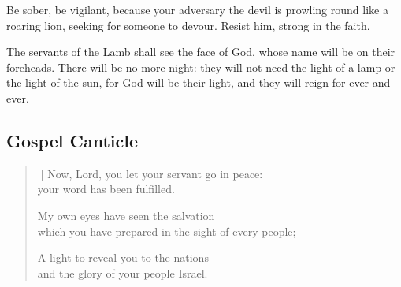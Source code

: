 \documentclass[12pt]{report}
\begin{document}
	\alternative

	\begin{scripture}[1 Peter 5.8, 9]
		Be sober, be vigilant, because your adversary the devil is prowling round like a roaring lion, seeking for someone to devour. Resist him, strong in the faith.
	\end{scripture}

	\newpage

	\alternative

	\begin{scripture}[Revelation 22.4, 5]
		The servants of the Lamb shall see the face of God, whose name will be on their foreheads. There will be no more night: they will not need the light of a lamp or the light of the sun, for God will be their light, and they will reign for ever and ever.
	\end{scripture}

	\vspace*{2ex}





	\subsection*{Gospel Canticle}



	\begin{verse}[\versewidth]
		Now, Lord, you let your servant go in peace: \Pause\\
		your word has been fulfilled.

		My own eyes have seen the salvation \Pause\\
		which you have prepared in the sight of every people;

		A light to reveal you to the nations \Pause\\
		and the glory of your people Israel.\\
	\end{verse}
\end{document}
